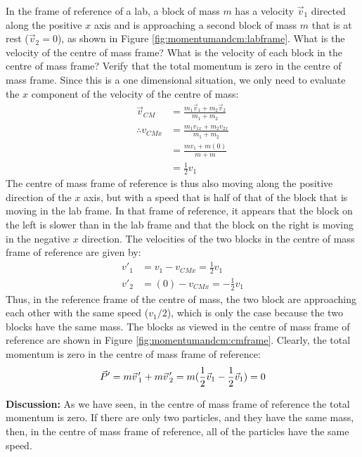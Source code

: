 \begin{example}{ In the frame of reference of a lab, a block of mass $m$ has a velocity $\vec v_1$ directed along the positive $x$ axis and is approaching a second block of mass $m$ that is at rest ($\vec v_2=0$), as shown in Figure \ref{fig:momentumandcm:labframe}. What is the velocity of the centre of mass frame? What is the velocity of each block in the centre of mass frame? Verify that the total momentum is zero in the centre of mass frame.}
Since this is a one dimensional situation, we only need to evaluate the $x$ component of the velocity of the centre of mass:
\begin{align*}
\vec v_{CM} &= \frac{m_1\vec v_1 + m_2\vec v_2 }{m_1+m_2}\\
\therefore v_{CMx} &= \frac{m_1 v_{1x} + m_2 v_{2x}}{m_1+m_2}\\
&=\frac{mv_1 + m(0) }{m+m}\\
&=\frac{1}{2}v_1
\end{align*}
The centre of mass frame of reference is thus also moving along the positive direction of the $x$ axis, but with a speed that is half of that of the block that is moving in the lab frame. In that frame of reference, it appears that the block on the left is slower than in the lab frame and that the block on the right is moving in the negative $x$ direction. The velocities of the two blocks in the centre of mass frame of reference are given by:
\begin{align*}
v'_1&=v_1-v_{CMx}=\frac{1}{2}v_1\\
v'_2&=(0)-v_{CMx}=-\frac{1}{2}v_1
\end{align*}
Thus, in the reference frame of the centre of mass, the two block are approaching each other with the same speed ($v_1/2$), which is only the case because the two blocks have the same mass. The blocks as viewed in the centre of mass frame of reference are shown in Figure \ref{fig:momentumandcm:cmframe}.
Clearly, the total momentum is zero in the centre of mass frame of reference:
\begin{align*}
\vec P' = m\pvec v'_1+ m\pvec v'_2 = m (\frac{1}{2}\vec v_1 - \frac{1}{2}\vec v_1) = 0
\end{align*}

\textbf{Discussion:} As we have seen, in the centre of mass frame of reference the total momentum is zero. If there are only two particles, and they have the same mass, then, in the centre of mass frame of reference, all of the particles have the same speed. 
\end{example}

